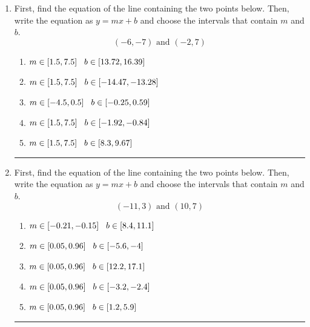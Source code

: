 \documentclass[14pt]{extbook}
\newcommand{\litem}[1]{\item#1\hspace*{-1cm}\rule{\textwidth}{0.4pt}}
\begin{document}
\begin{enumerate}
{\begin{enumerate}[label=\Alph*.]
\end{enumerate} }
\litem{
First, find the equation of the line containing the two points below. Then, write the equation as $ y=mx+b $ and choose the intervals that contain $m$ and $b$.\[ (-6, -7) \text{ and } (-2, 7) \]\begin{enumerate}[label=\Alph*.]
\item \( m \in [1.5, 7.5] \hspace*{3mm} b \in [13.72, 16.39] \)
\item \( m \in [1.5, 7.5] \hspace*{3mm} b \in [-14.47, -13.28] \)
\item \( m \in [-4.5, 0.5] \hspace*{3mm} b \in [-0.25, 0.59] \)
\item \( m \in [1.5, 7.5] \hspace*{3mm} b \in [-1.92, -0.84] \)
\item \( m \in [1.5, 7.5] \hspace*{3mm} b \in [8.3, 9.67] \)

\end{enumerate} }
\litem{
First, find the equation of the line containing the two points below. Then, write the equation as $ y=mx+b $ and choose the intervals that contain $m$ and $b$.\[ (-11, 3) \text{ and } (10, 7) \]\begin{enumerate}[label=\Alph*.]
\item \( m \in [-0.21, -0.15] \hspace*{3mm} b \in [8.4, 11.1] \)
\item \( m \in [0.05, 0.96] \hspace*{3mm} b \in [-5.6, -4] \)
\item \( m \in [0.05, 0.96] \hspace*{3mm} b \in [12.2, 17.1] \)
\item \( m \in [0.05, 0.96] \hspace*{3mm} b \in [-3.2, -2.4] \)
\item \( m \in [0.05, 0.96] \hspace*{3mm} b \in [1.2, 5.9] \)


\end{enumerate}}
\end{enumerate}
\end{document}

